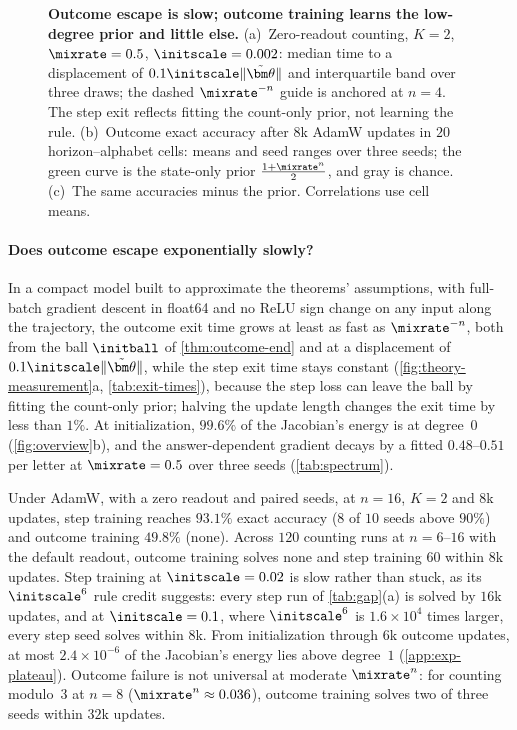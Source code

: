\begin{figure}[t]
\centering
\resizebox{\linewidth}{!}{}
\caption{\textbf{Outcome escape is slow; outcome training learns the low-degree prior and little else.}
(a)~Zero-readout counting, $K=2$, $\mixrate=0.5$, $\initscale=0.002$: median time to a displacement of $0.1\initscale\|\tilde{\bm\theta}\|$ and interquartile band over three draws; the dashed $\mixrate^{-n}$ guide is anchored at $n=4$. The step exit reflects fitting the count-only prior, not learning the rule.
(b)~Outcome exact accuracy after $8$k AdamW updates in $20$ horizon--alphabet cells: means and seed ranges over three seeds; the green curve is the state-only prior $\frac{1+\mixrate^n}{2}$, and gray is chance.
(c)~The same accuracies minus the prior. Correlations use cell means.}
\label{fig:theory-measurement}
\label{fig:lambda-grid}
\end{figure}

\paragraph{Does outcome escape exponentially slowly?} In a compact model built to approximate the theorems' assumptions, with full-batch gradient descent
in float64 and no ReLU sign change on any input along the trajectory, the outcome exit time grows at least as fast as $\mixrate^{-n}$, both from the
ball $\initball$ of \cref{thm:outcome-end} and at a displacement of $0.1\initscale\|\tilde{\bm\theta}\|$, while the step exit time stays
constant (\cref{fig:theory-measurement}a, \cref{tab:exit-times}), because the step loss can leave the ball by fitting the count-only prior;
halving the update length changes the exit time by less than $1\%$. At
initialization, $99.6\%$ of the Jacobian's energy is at degree~$0$ (\cref{fig:overview}b), and the answer-dependent
gradient decays by a fitted $0.48$--$0.51$ per letter at $\mixrate=0.5$ over three seeds (\cref{tab:spectrum}).

Under AdamW, with a zero readout and paired seeds, at $n=16$, $K=2$ and $8$k updates, step training reaches
$93.1\%$ exact accuracy ($8$ of $10$ seeds above $90\%$) and outcome training $49.8\%$ (none). Across $120$ counting runs at
$n=6$--$16$ with the default readout, outcome training solves none and step training $60$ within $8$k updates. Step
training at $\initscale=0.02$ is slow rather than stuck, as its $\initscale^6$ rule credit suggests: every step run of
\cref{tab:gap}(a) is solved by $16$k updates, and at $\initscale=0.1$, where $\initscale^6$ is $1.6\times10^4$ times larger, every
step seed solves within $8$k. From initialization through $6$k outcome updates, at most $2.4\times10^{-6}$ of the Jacobian's
energy lies above degree~$1$ (\cref{app:exp-plateau}). Outcome failure is not universal at moderate $\mixrate^n$: for counting
modulo~$3$ at $n=8$ ($\mixrate^n\approx0.036$), outcome training solves two of three seeds within $32$k updates.

